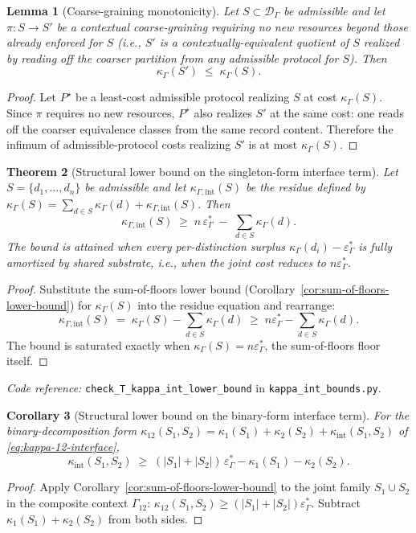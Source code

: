 \documentclass[11pt]{article}
\newtheorem{theorem}{Theorem}[section]
\newtheorem{lemma}[theorem]{Lemma}
\newtheorem{corollary}[theorem]{Corollary}
\newcommand{\coderef}[2]{\smallskip\noindent\textit{Code reference:} \texttt{#1} in \texttt{#2}.}
\begin{document}
\begin{lemma}[Coarse-graining monotonicity]
\label{lem:coarse-graining-monotonicity}
Let $S\subset\mathcal D_\Gamma$ be admissible and let $\pi:S\to S'$ be a contextual coarse-graining requiring no new resources beyond those already enforced for $S$ (i.e., $S'$ is a contextually-equivalent quotient of $S$ realized by reading off the coarser partition from any admissible protocol for $S$).  Then
\[
    \kappa_\Gamma(S')\;\le\;\kappa_\Gamma(S).
\]
\end{lemma}
\begin{proof}
Let $P^\star$ be a least-cost admissible protocol realizing $S$ at cost $\kappa_\Gamma(S)$.  Since $\pi$ requires no new resources, $P^\star$ also realizes $S'$ at the same cost: one reads off the coarser equivalence classes from the same record content.  Therefore the infimum of admissible-protocol costs realizing $S'$ is at most $\kappa_\Gamma(S)$.
\end{proof}

\begin{theorem}[Structural lower bound on the singleton-form interface term]
\label{thm:kappa-int-singleton-shape}
Let $S=\{d_1,\ldots,d_n\}$ be admissible and let $\kappa_{\Gamma,\mathrm{int}}(S)$ be the residue defined by
\(
    \kappa_\Gamma(S) = \sum_{d\in S}\kappa_\Gamma(d) + \kappa_{\Gamma,\mathrm{int}}(S).
\)
Then
\[
    \kappa_{\Gamma,\mathrm{int}}(S)
    \;\ge\;
    n\,\varepsilon^*_\Gamma \;-\; \sum_{d\in S}\kappa_\Gamma(d).
\]
The bound is attained when every per-distinction surplus $\kappa_\Gamma(d_i) - \varepsilon^*_\Gamma$ is fully amortized by shared substrate, i.e., when the joint cost reduces to $n\varepsilon^*_\Gamma$.
\end{theorem}
\begin{proof}
Substitute the sum-of-floors lower bound (Corollary~\ref{cor:sum-of-floors-lower-bound}) for $\kappa_\Gamma(S)$ into the residue equation and rearrange:
\[
    \kappa_{\Gamma,\mathrm{int}}(S)
    \;=\;
    \kappa_\Gamma(S) - \sum_{d\in S}\kappa_\Gamma(d)
    \;\ge\;
    n\varepsilon^*_\Gamma - \sum_{d\in S}\kappa_\Gamma(d).
\]
The bound is saturated exactly when $\kappa_\Gamma(S) = n\varepsilon^*_\Gamma$, the sum-of-floors floor itself.
\end{proof}
\coderef{check\_T\_kappa\_int\_lower\_bound}{kappa\_int\_bounds.py}

\begin{corollary}[Structural lower bound on the binary-form interface term]
\label{cor:kappa-int-binary-shape}
For the binary-decomposition form
\(
    \kappa_{12}(S_1,S_2) = \kappa_1(S_1) + \kappa_2(S_2) + \kappa_{\mathrm{int}}(S_1,S_2)
\)
of \eqref{eq:kappa-12-interface},
\[
    \kappa_{\mathrm{int}}(S_1,S_2)
    \;\ge\;
    (|S_1|+|S_2|)\,\varepsilon^*_\Gamma - \kappa_1(S_1) - \kappa_2(S_2).
\]
\end{corollary}
\begin{proof}
Apply Corollary~\ref{cor:sum-of-floors-lower-bound} to the joint family $S_1\cup S_2$ in the composite context $\Gamma_{12}$: $\kappa_{12}(S_1,S_2) \ge (|S_1|+|S_2|)\varepsilon^*_\Gamma$.  Subtract $\kappa_1(S_1)+\kappa_2(S_2)$ from both sides.
\end{proof}
\end{document}
